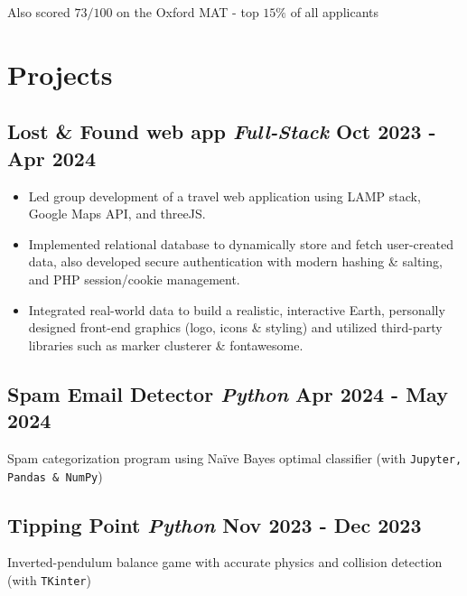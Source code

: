 \documentclass[a4paper,10pt]{article}
\begin{document}
\vspace{1ex}
\hspace{4ex} Also scored $73/100$ on the Oxford MAT - top $15\%$ of all applicants    
\vspace{-2mm}

\section*{ Projects}

\subsection*{Lost \& Found web app \hfill 
{\color{black}\textit{\textmd{Full-Stack}}}\hspace{1ex} Oct 2023 - Apr 2024}
\begin{itemize}
\vspace{-1.7em}
\setlength\itemsep{-0.7ex}
    \item Led group development of a travel web application using LAMP stack, Google Maps API, and threeJS.
    \item Implemented relational database to dynamically store and fetch user-created data, also developed secure authentication with modern hashing \& salting, and PHP session/cookie management.
    \item Integrated real-world data to build a realistic, interactive Earth, personally designed front-end graphics (logo, icons \& styling) and utilized third-party libraries such as marker clusterer \& fontawesome.
\end{itemize}
 
\subsection*{Spam Email Detector \hfill
{\color{black}\textit{\textmd{Python}}}\hspace{1ex} Apr 2024 - May 2024}
Spam categorization program using Naïve Bayes optimal classifier (with \texttt{Jupyter, Pandas \& NumPy})

\subsection*{Tipping Point \hfill
{\color{black}\textit{\textmd{Python}}}\hspace{1ex} Nov 2023 - Dec 2023}
Inverted-pendulum balance game with accurate physics and collision detection (with \texttt{TKinter})
\end{document}
